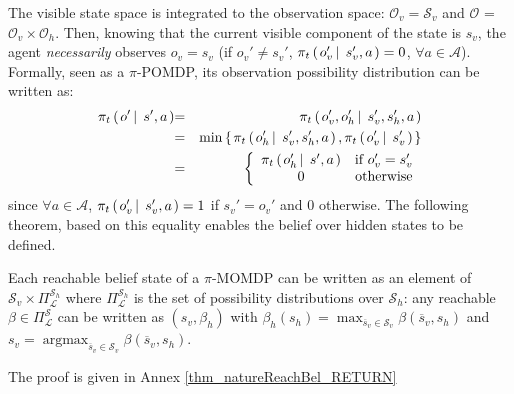 The visible state space is integrated to the observation 
space: $\mathcal{O}_v=\mathcal{S}_v$ and $\mathcal{O}$ = $ \mathcal{O}_v \times \mathcal{O}_h$. Then, knowing
 that the current visible component of the state is $s_v$, the agent
 \textit{necessarily} observes $o_v=s_v$ (if $o_v' \neq s_v'$, $\pi_t \left( \left.  o_v' \, \right| \left. \, s_v', a  \right. \right) = 0$, $\forall a \in \mathcal{A}$).
 Formally, seen as a $\pi$-POMDP, its observation possibility 
distribution can be written as:
\begin{eqnarray} 
\nonumber \pi_t \paren{o' \sachant s',a } \hspace{-0.1cm}  & = & \pi_t \paren{ o_v',o_h' \sachant s_v',s_h',a } \\
\nonumber & = & \min \set{ \pi_t \paren{o_h' \sachant s_v',s_h',a }, \pi_t \paren{ o_v' \sachant s_v'} } \\
\label{simplif1}   & = & \left \{ \begin{array}{ccc} 
\pi_t \paren{ o_h' \sachant s',a } & \mbox{if  } o_v' = s_v' \\
0 & \mbox{otherwise} 
\end{array} \right.
\end{eqnarray}
since $\forall a \in \mathcal{A}$, 
$\pi_t \left( \left.  o_v' \, \right| \left. \, s_v',a \right. \right) = 1$ if $s_v'=o_v'$ and $0$ otherwise. 
The following theorem, based on this equality enables the
belief over hidden states to be defined.
\begin{theorem}
\label{thm_natureReachBel} Each reachable belief state of a $\pi$-MOMDP can be
written as an element of $\mathcal{S}_v \times \Pi^{\mathcal{S}_h}_{\mathcal{L}}$ where $\Pi^{\mathcal{S}_h}_{\mathcal{L}}$
is the set of possibility distributions over $\mathcal{S}_h$: any reachable $\beta \in \Pi^{\mathcal{S}}_{\mathcal{L}}$
can be written as $(s_v,\beta_h)$ with $\beta_h(s_h) = \max_{\overline{s}_v \in \mathcal{S}_v} \beta(\overline{s}_v,s_h)$ and $s_v = \operatorname*{argmax}_{\overline{s}_v \in \mathcal{S}_v} \beta(\overline{s}_v,s_h)$.
\end{theorem}
The proof is given in Annex \ref{thm_natureReachBel_RETURN}

